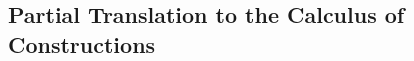 \begin{appendices}

\chapter{Partial Translation to the Calculus of Constructions}
\label{chap:translation-to-coc}

\end{appendices}
